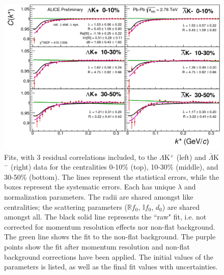 \documentclass[../AnalysisNoteJBuxton.tex]{subfiles}
\begin{document}
\begin{figure}[h]
  \centering
  \includegraphics[width=\textwidth]{7_ResultsAndDiscussion/Figures/canKStarCfwFitsLamKchPwConj_0010_1030_3050_MomResCrctn_NonFlatBgdCrctn_3Res_PrimMaxDecay4fm_UsingXiDataAndCoulombOnly.pdf}
  \caption[$\Lambda$K$^{+}$($\bar{\Lambda}$K$^{-}$) Fits with 3 Residuals]{Fits, with 3 residual correlations included, to the $\Lambda$K$^{+}$ (left) and $\bar{\Lambda}$K$^{-}$ (right) data for the centralities 0-10\% (top), 10-30\% (middle), and 30-50\% (bottom).
The lines represent the statistical errors, while the boxes represent the systematic errors.  
Each has unique $\lambda$ and normalization parameters.
The radii are shared amongst like centralities; the scattering parameters ($\mathbb{R}f_{0}$, $\mathbb{I}f_{0}$, $d_{0}$) are shared amongst all.
The black solid line represents the ``raw" fit, i.e. not corrected for momentum resolution effects nor non-flat background.  
The green line shows the fit to the non-flat background.
The purple points show the fit after momentum resolution and non-flat background corrections have been applied.
The initial values of the parameters is listed, as well as the final fit values with uncertainties.}
  \label{fig:LamKchPwConjFits_3Res}
\end{figure}
\end{document}
